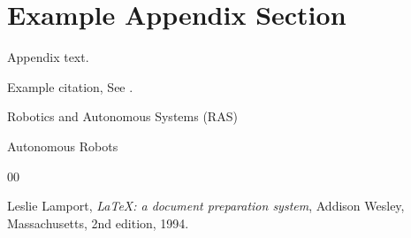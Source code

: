 \documentclass[preprint,12pt]{elsarticle}
\begin{document}
\appendix
\section{Example Appendix Section}
\label{app1}

Appendix text.


Example citation, See \cite{lamport94}.

Robotics and Autonomous Systems (RAS)


Autonomous Robots



\begin{thebibliography}{00}


  Leslie Lamport,
  \textit{\LaTeX: a document preparation system},
  Addison Wesley, Massachusetts,
  2nd edition,
  1994.

\end{thebibliography}
\end{document}
